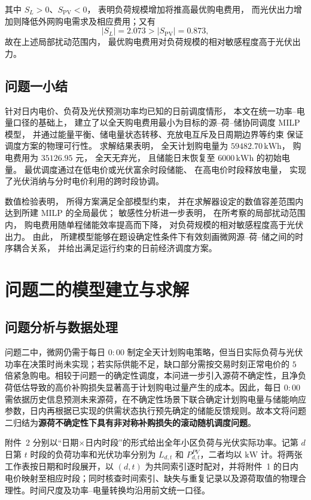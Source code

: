 \documentclass[zihao=-4,a4paper,UTF8,fontset=none]{ctexart}
\begin{document}
其中 $S_L>0$、$S_{\mathrm{PV}}<0$，
表明负荷规模增加将推高最优购电费用，
而光伏出力增加则降低外网购电需求及相应费用；又有
\begin{equation}
    |S_L|=2.073>|S_{\mathrm{PV}}|=0.873,
    \label{eq:q1_sensitivity_comparison}
\end{equation}
故在上述局部扰动范围内，
最优购电费用对负荷规模的相对敏感程度高于光伏出力。

\subsection{问题一小结}

针对日内电价、负荷及光伏预测功率均已知的日前调度情形，
本文在统一功率--电量口径的基础上，
建立了以全天购电费用最小为目标的源--荷--储协同调度 MILP 模型，
并通过能量平衡、储电量状态转移、充放电互斥及日周期边界等约束
保证调度方案的物理可行性。
求解结果表明，
全天计划购电量为 $59482.70\,\mathrm{kWh}$，
购电费用为 $35126.95$ 元，
全天无弃光，
且储能日末恢复至 $6000\,\mathrm{kWh}$ 的初始电量。
最优调度通过在低电价或光伏富余时段储能、
在高电价时段释放电量，
实现了光伏消纳与分时电价利用的跨时段协调。

数值检验表明，
所得方案满足全部模型约束，
并在求解器设定的数值容差范围内达到所建 MILP 的全局最优；
敏感性分析进一步表明，
在所考察的局部扰动范围内，
购电费用随单程储能效率提高而下降，
对负荷规模的相对敏感程度高于光伏出力。
由此，
所建模型能够在题设确定性条件下有效刻画微网源--荷--储之间的时序耦合关系，
并给出满足运行约束的日前经济调度方案。

\section{问题二的模型建立与求解}

\subsection{问题分析与数据处理}

问题二中，微网仍需于每日 $0{:}00$ 制定全天计划购电策略，但当日实际负荷与光伏功率在决策时尚未实现；若实际供能不足，缺口部分需按交易时刻正常电价的 $5$ 倍紧急购电。相较于问题一的确定性调度，本问进一步引入源荷不确定性，且净负荷低估导致的高价补购损失显著高于计划购电过量产生的成本。因此，每日 $0{:}00$ 需依据历史信息预测未来源荷，在不确定性场景下联合确定计划购电量与储能响应参数，日内再根据已实现的供需状态执行预先确定的储能反馈规则。故本文将问题二归结为\textbf{源荷不确定性下具有非对称补购损失的滚动随机调度问题}。

附件~2 分别以“日期$\times$日内时段”的形式给出全年小区负荷与光伏实际功率。记第 $d$ 日第 $t$ 时段的负荷功率和光伏功率分别为 $L_{d,t}$ 和 $P_{d,t}^{PV}$，二者均以 $\mathrm{kW}$ 计。将两张工作表按日期和时段展开，以 $(d,t)$ 为共同索引逐时配对，并将附件~1 的日内电价映射至相应时段；同时核查时间索引、缺失与重复记录以及源荷取值的物理合理性。时间尺度及功率--电量转换均沿用前文统一口径。
\end{document}

